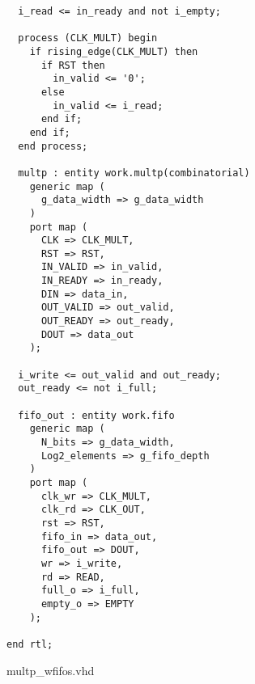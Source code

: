 \begin{code}
\begin{verbatim}
  i_read <= in_ready and not i_empty;

  process (CLK_MULT) begin
    if rising_edge(CLK_MULT) then
      if RST then
        in_valid <= '0';
      else
        in_valid <= i_read;
      end if;
    end if;
  end process;

  multp : entity work.multp(combinatorial)
    generic map (
      g_data_width => g_data_width
    )
    port map (
      CLK => CLK_MULT,
      RST => RST,
      IN_VALID => in_valid,
      IN_READY => in_ready,
      DIN => data_in,
      OUT_VALID => out_valid,
      OUT_READY => out_ready,
      DOUT => data_out
    );

  i_write <= out_valid and out_ready;
  out_ready <= not i_full;

  fifo_out : entity work.fifo
    generic map (
      N_bits => g_data_width,
      Log2_elements => g_fifo_depth
    )
    port map (
      clk_wr => CLK_MULT,
      clk_rd => CLK_OUT,
      rst => RST,
      fifo_in => data_out,
      fifo_out => DOUT,
      wr => i_write,
      rd => READ,
      full_o => i_full,
      empty_o => EMPTY
    );

end rtl;
\end{verbatim}
\caption{multp\_wfifos.vhd}
\label{ap-cod:7}
\end{code}

